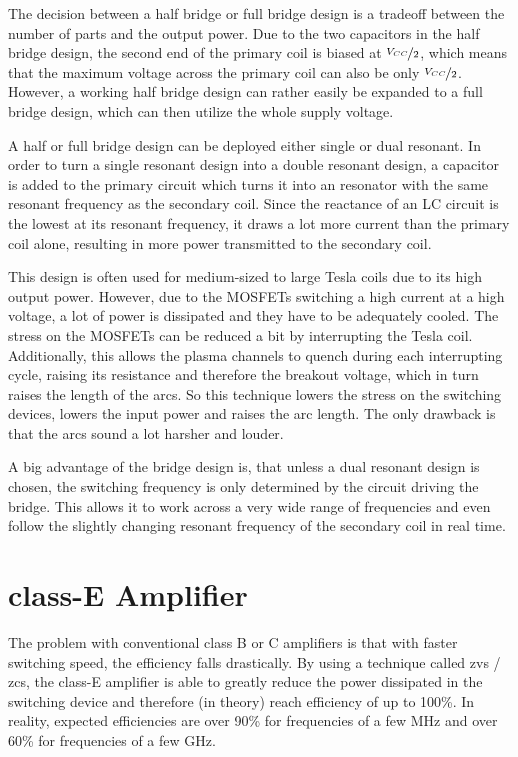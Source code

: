 The decision between a half bridge or full bridge design is a tradeoff between the number of parts and the output power. Due to the two capacitors in the half bridge design, the second end of the primary coil is biased at  \(\nicefrac{V_{CC}}{2}\), which means that the maximum voltage across the primary coil can also be only \(\nicefrac{V_{CC}}{2}\). However, a working half bridge design can rather easily be expanded to a full bridge design, which can then utilize the whole supply voltage.

A half or full bridge design can be deployed either single or dual resonant. In order to turn a single resonant design into a double resonant design, a capacitor is added to the primary circuit which turns it into an resonator with the same resonant frequency as the secondary coil. Since the reactance of an LC circuit is the lowest at its resonant frequency, it draws a lot more current than the primary coil alone, resulting in more power transmitted to the secondary coil.

This design is often used for medium-sized to large Tesla coils due to its high output power. However, due to the MOSFETs switching a high current at a high voltage, a lot of power is dissipated and they have to be adequately cooled. The stress on the MOSFETs can be reduced a bit by interrupting the Tesla coil. Additionally, this allows the plasma channels to quench during each interrupting cycle, raising its resistance and therefore the breakout voltage, which in turn raises the length of the arcs. So this technique lowers the stress on the switching devices, lowers the input power and raises the arc length. The only drawback is that the arcs sound a lot harsher and louder.

A big advantage of the bridge design is, that unless a dual resonant design is chosen, the switching frequency is only determined by the circuit driving the bridge. This allows it to work across a very wide range of frequencies and even follow the slightly changing resonant frequency of the secondary coil in real time.


\section{class-E Amplifier}

The problem with conventional class B or C amplifiers is that with faster switching speed, the efficiency falls drastically. By using a technique called \gls{zvs} / \gls{zcs}, the class-E amplifier is able to greatly reduce the power dissipated in the switching device and therefore (in theory) reach efficiency of up to 100\%. In reality, expected efficiencies are over 90\% for frequencies of a few MHz and over 60\% for frequencies of a few GHz.

